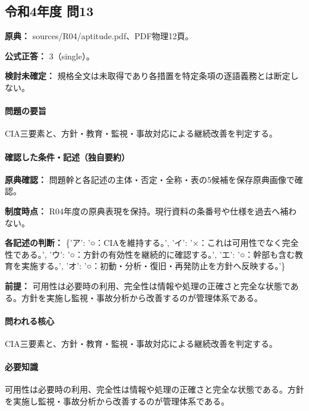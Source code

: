 \subsection{令和4年度 問13}
\label{q:r04-reg-apt-13}

\noindent\textbf{原典：} sources/R04/aptitude.pdf、PDF物理12頁。

\textbf{公式正答：} 3（single）。

\par\textbf{検討未確定：} 規格全文は未取得であり各措置を特定条項の逐語義務とは断定しない。

\paragraph{問題の要旨} CIA三要素と、方針・教育・監視・事故対応による継続改善を判定する。

\paragraph{確認した条件・記述（独自要約）}\mbox{}\par

\noindent\textbf{原典確認：} 問題幹と各記述の主体・否定・全称・表の5候補を保存原典画像で確認。\par

\noindent\textbf{制度時点：} R04年度の原典表現を保持。現行資料の条番号や仕様を過去へ補わない。\par

\noindent\textbf{各記述の判断：} \{'ア': '○：CIAを維持する。', 'イ': '×：これは可用性でなく完全性である。', 'ウ': '○：方針の有効性を継続的に確認する。', 'エ': '○：幹部も含む教育を実施する。', 'オ': '○：初動・分析・復旧・再発防止を方針へ反映する。'\}\par

\noindent\textbf{前提：} 可用性は必要時の利用、完全性は情報や処理の正確さと完全な状態である。方針を実施し監視・事故分析から改善するのが管理体系である。\par

\paragraph{問われる核心} CIA三要素と、方針・教育・監視・事故対応による継続改善を判定する。

\paragraph{必要知識} 可用性は必要時の利用、完全性は情報や処理の正確さと完全な状態である。方針を実施し監視・事故分析から改善するのが管理体系である。

